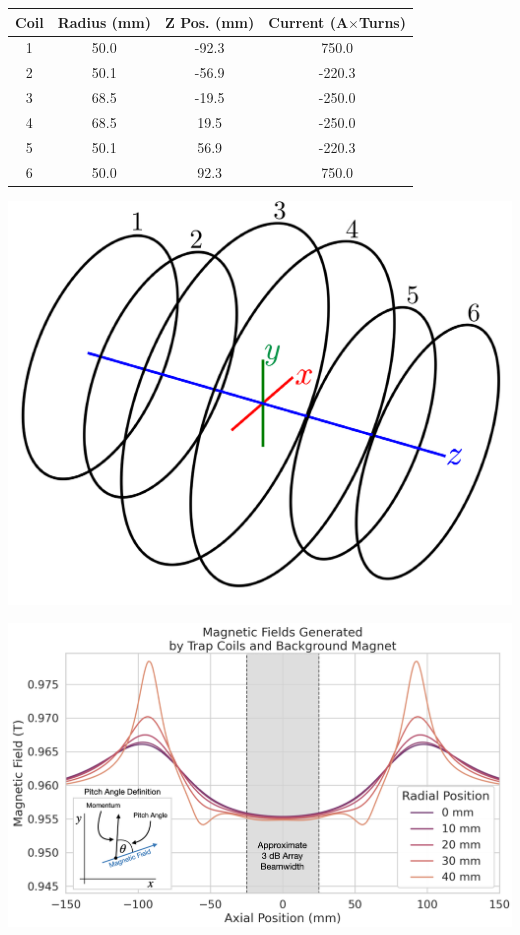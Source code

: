 \begin{table}[htbp]
    \footnotesize
    \begin{minipage}{0.65\textwidth}
        \centering
        \begin{tabular}{c|c|c|c}
            Coil & Radius (mm) & Z Pos. (mm) & Current (A$\times$Turns)\\
            \hline
            1 & 50.0 & -92.3 & 750.0\\
            2 & 50.1 & -56.9 & -220.3\\
            3 & 68.5 & -19.5 & -250.0\\
            4 & 68.5 & 19.5 & -250.0\\
            5 & 50.1 & 56.9 & -220.3\\
            6 & 50.0 & 92.3 & 750.0\\
        \end{tabular}
        \end{minipage}
    \begin{minipage}{0.35\textwidth}
        \centering
        \includegraphics[width=1\textwidth]{figs/Chapter-4/230512_trap10_coils.png}
        \label{fig:chap4-trap10-coils} 
    \end{minipage}
    \par
    \centering
    \begin{minipage}{0.7\textwidth}
        \centering
        \includegraphics[width=1\textwidth]{figs/Chapter-4/230214_annotate_trap_profile_image.001.png}

\end{minipage}
\end{table}
